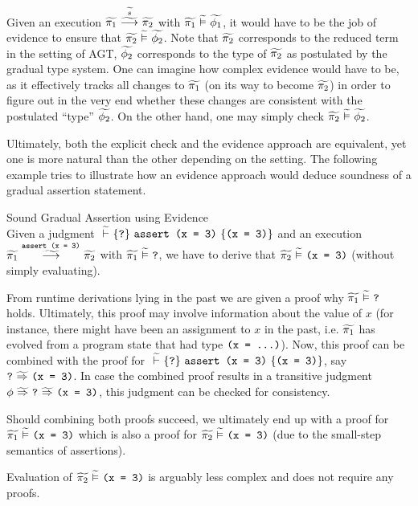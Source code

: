Given an execution $\gsstepConsume{\grad{s}}{\grad{\pi_1}}{\grad{\pi_2}}$ with $\evalgphiGen{\grad{\pi_1}}{\grad{\phi_1}}$, it would have to be the job of evidence to ensure that $\evalgphiGen{\grad{\pi_2}}{\grad{\phi_2}}$.
Note that $\grad{\pi_2}$ corresponds to the reduced term in the setting of AGT, $\grad{\phi_2}$ corresponds to the type of $\grad{\pi_2}$ as postulated by the gradual type system.
One can imagine how complex evidence would have to be, as it effectively tracks all changes to $\grad{\pi_1}$ (on its way to become $\grad{\pi_2}$) in order to figure out in the very end whether these changes are consistent with the postulated “type” $\grad{\phi_2}$.
On the other hand, one may simply check $\evalgphiGen{\grad{\pi_2}}{\grad{\phi_2}}$.

Ultimately, both the explicit check and the evidence approach are equivalent, yet one is more natural than the other depending on the setting.
The following example tries to illustrate how an evidence approach would deduce soundness of a gradual assertion statement.
\begin{example}{Sound Gradual Assertion using Evidence}~\\
    Given a judgment $\gthoare{}{\qm}{\sAssert{\phiEq{x}{3}}}{\phiEq{x}{3}}$ and an execution $\gsstepConsume{\sAssert{\phiEq{x}{3}}}{\grad{\pi_1}}{\grad{\pi_2}}$ with $\evalgphiGen{\grad{\pi_1}}{\qm}$, we have to derive that $\evalgphiGen{\grad{\pi_2}}{\phiEq{x}{3}}$ (without simply evaluating).
    
    From runtime derivations lying in the past we are given a proof why $\evalgphiGen{\grad{\pi_1}}{\qm}$ holds.
    Ultimately, this proof may involve information about the value of $x$ (for instance, there might have been an assignment to $x$ in the past, i.e. $\grad{\pi_1}$ has evolved from a program state that had type $\phiEq{x}{...}$).
    Now, this proof can be combined with the proof for $\gthoare{}{\qm}{\sAssert{\phiEq{x}{3}}}{\phiEq{x}{3}}$, say $\gphiImplies{\qm}{\phiEq{x}{3}}$.
    In case the combined proof results in a transitive judgment $\gphiImplies{\phi}{\gphiImplies{\qm}{\phiEq{x}{3}}}$, this judgment can be checked for consistency.
    
    Should combining both proofs succeed, we ultimately end up with a proof for $\evalgphiGen{\grad{\pi_1}}{\phiEq{x}{3}}$ which is also a proof for $\evalgphiGen{\grad{\pi_2}}{\phiEq{x}{3}}$ (due to the small-step semantics of assertions).
    
    Evaluation of $\evalgphiGen{\grad{\pi_2}}{\phiEq{x}{3}}$ is arguably less complex and does not require any proofs.
\end{example}

